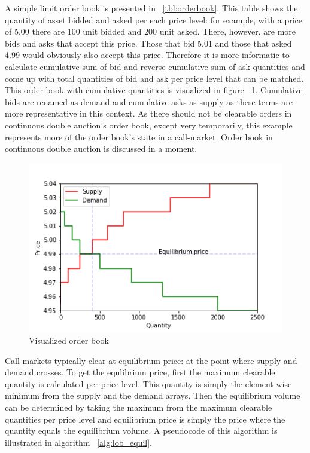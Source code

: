 A simple limit order book is presented in ~\ref{tbl:orderbook}. This table shows the
quantity of asset bidded and asked per each price level: for example, with a price of 5.00
there are 100 unit bidded and 200 unit asked. There, however, are more bids and asks that 
accept this price. Those that bid 5.01 and those that asked 4.99 would obviously also accept
this price. Therefore it is more informatic to calculate cumulative sum of bid and reverse cumulative sum of 
ask quantities and come up with total quantities of bid and ask per price level that can be matched.  
This order book with cumulative quantities is visualized in figure ~\ref{fig:lob_visual}. Cumulative bids
are renamed as demand and cumulative asks as supply as these terms are more representative in this context.
As there should not be clearable orders in continuous 
double auction's order book, except very temporarily, 
this example represents more of the order book's state in a call-market. Order book
in continuous double auction is discussed in a moment.

\begin{figure}
    \begin{center}  
        \includegraphics{plots/orderbook_visualized.png}
        \caption{Visualized order book}
        \label{fig:lob_visual}
    \end{center}
\end{figure}

Call-markets typically clear at equilibrium price: at the point where
supply and demand crosses. 
To get the equlibrium price, first the maximum clearable quantity
is calculated per price level. This quantity is simply the element-wise
minimum from the supply and the demand arrays. Then the equilibrium volume
can be determined by taking the maximum from the maximum clearable quantities
per price level and equilibrium price is simply the price where the quantity
equals the equilibrium volume. A pseudocode of this algorithm is illustrated in 
algorithm ~\ref{alg:lob_equil}.


